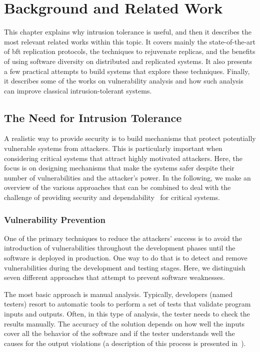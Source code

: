 \chapter{Background and Related Work}
\label{chap:related_work}


This chapter explains why intrusion tolerance is useful, and then it describes the most relevant related works within this topic.
It covers mainly the state-of-the-art of \gls{bft} replication protocols, the techniques to rejuvenate replicas, and the benefits of using software diversity on distributed and replicated systems.
It also presents a few practical attempts to build systems that explore these techniques.
Finally, it describes some of the works on vulnerability analysis and how such analysis can improve classical intrusion-tolerant systems.


\section{The Need for Intrusion Tolerance}
A realistic way to provide security is to build mechanisms that protect potentially vulnerable systems from attackers.
This is particularly important when considering critical systems that attract highly motivated attackers. 
Here, the focus is on designing mechanisms that make the systems safer despite their number of vulnerabilities and the attacker's power.
In the following, we make an overview of the various approaches that can be combined to deal with the challenge of providing security and dependability~\cite{Avizienis:2004} for critical systems.

\subsection{Vulnerability Prevention}
One of the primary techniques to reduce the attackers' success is to avoid the introduction of vulnerabilities throughout the development phases until the software is deployed in production. 
One way to do that is to detect and remove vulnerabilities during the development and testing stages.
Here, we distinguish seven different approaches that attempt to prevent software weaknesses. 

The most basic approach is manual analysis.
Typically, developers (named testers) resort to automatic tools to perform a set of tests that validate program inputs and outputs.
Often, in this type of analysis, the tester needs to check the results manually. 
The accuracy of the solution depends on how well the inputs cover all the behavior of the software and if the tester understands well the causes for the output violations (a description of this process is presented in~\cite{Votipka:2018}).


